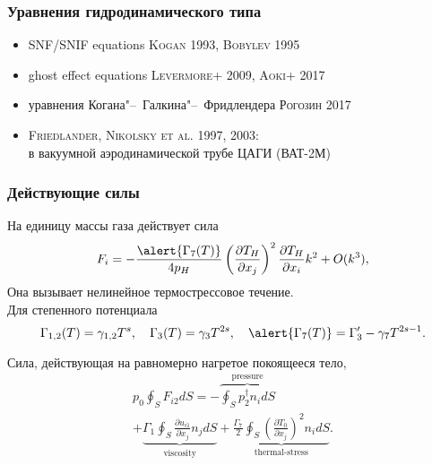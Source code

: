 \documentclass[mathserif]{beamer} %
\newcommand{\dd}{d}%
\newcommand{\pder}[2][]{\frac{\partial#1}{\partial#2}}
\newcommand{\OO}[1]{O(#1)}
\newcommand{\Cite}[2][]{\alert{\textsc{#2 #1}}}
\begin{document}
\begin{frame}
    \frametitle{Уравнения гидродинамического типа}
    \vspace{10pt}
    \begin{itemize}
        \item SNF/SNIF equations \Cite[1993]{Kogan}, \Cite[1995]{Bobylev}
        \item ghost effect equations \Cite[2009]{Levermore+}, \Cite[2017]{Aoki+}
        \item уравнения Когана"--~Галкина"--~Фридлендера \Cite[2017]{Рогозин}
    \end{itemize}
    \vspace{20pt}
    \begin{itemize}
        \item \Cite[1997, 2003]{Friedlander, Nikolsky et al.}:\\
            в вакуумной аэродинамической трубе ЦАГИ (ВАТ-2М)
    \end{itemize}
\end{frame}

\begin{frame}
    \frametitle{Действующие силы}
    На единицу массы газа действует сила
    \begin{equation}\label{eq:gamma7_force}
        F_i = -\frac{\alert{\Gamma_7(T)}}{4p_H} \left(\pder[T_H]{x_j}\right)^2 \pder[T_H]{x_i} k^2 + \OO{k^3},
    \end{equation}
    Она вызывает \alert{нелинейное термострессовое течение}.\\
    Для степенного потенциала
    \[ \Gamma_{1,2}(T) = \gamma_{1,2}T^s, \quad \Gamma_3(T) = \gamma_3T^{2s},
        \quad \alert{\Gamma_7(T)} = \Gamma_3' - \gamma_7T^{2s-1}. \]
    \pause\vspace{-10pt}

    Сила, действующая на равномерно нагретое покоящееся тело,
    \begin{multline}\label{eq:force:terms}
        p_0 \oint_S F_{i2} \dd{S} =
            - \overbrace{ \oint_S p_2^\dag n_i \dd{S} }^\text{pressure} \\
            + \underbrace{ \Gamma_1\oint_S \pder[u_{i1}]{x_j} n_j \dd{S} }_\text{viscosity}
            + \underbrace{ \frac{\Gamma_7}{2} \oint_S \left(\pder[T_0]{x_j}\right)^2 n_i \dd{S} }_\text{thermal-stress}.
    \end{multline}
\end{frame}
\end{document}
